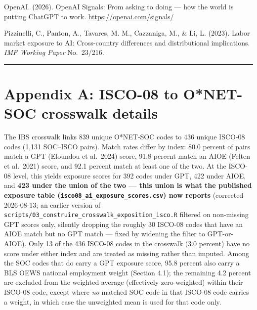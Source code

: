 \documentclass[
  11pt,
]{article}
\begin{document}
OpenAI. (2026). OpenAI Signals: From asking to doing --- how the world
is putting ChatGPT to work. \url{https://openai.com/signals/}

Pizzinelli, C., Panton, A., Tavares, M. M., Cazzaniga, M., \& Li, L.
(2023). Labor market exposure to AI: Cross-country differences and
distributional implications. \emph{IMF Working Paper} No.~23/216.

\begin{center}\rule{0.5\linewidth}{0.5pt}\end{center}

\section{Appendix A: ISCO-08 to O*NET-SOC crosswalk
details}\label{appendix-a-isco-08-to-onet-soc-crosswalk-details}

The IBS crosswalk links 839 unique O*NET-SOC codes to 436 unique ISCO-08
codes (1,131 SOC--ISCO pairs). Match rates differ by index: 80.0 percent
of pairs match a GPT (Eloundou et al.~2024) score, 91.8 percent match an
AIOE (Felten et al.~2021) score, and 92.1 percent match at least one of
the two. At the ISCO-08 level, this yields exposure scores for 392 codes
under GPT, 422 under AIOE, and \textbf{423 under the union of the two
--- this union is what the published exposure table
(\texttt{isco08\_ai\_exposure\_scores.csv}) now reports} (corrected
2026-08-13; an earlier version of
\texttt{scripts/03\_construire\_crosswalk\_exposition\_isco.R} filtered
on non-missing GPT scores only, silently dropping the roughly 30 ISCO-08
codes that have an AIOE match but no GPT match --- fixed by widening the
filter to GPT-or-AIOE). Only 13 of the 436 ISCO-08 codes in the
crosswalk (3.0 percent) have no score under either index and are treated
as missing rather than imputed. Among the SOC codes that do carry a GPT
exposure score, 95.8 percent also carry a BLS OEWS national employment
weight (Section 4.1); the remaining 4.2 percent are excluded from the
weighted average (effectively zero-weighted) within their ISCO-08 code,
except where \emph{no} matched SOC code in that ISCO-08 code carries a
weight, in which case the unweighted mean is used for that code only.
\end{document}
